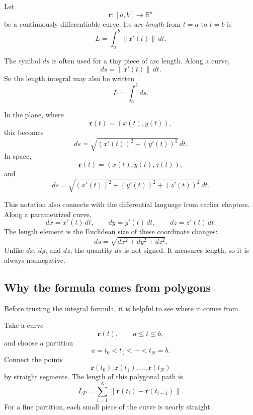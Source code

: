 \begin{definition}
Let
\[
    \mathbf r:[a,b]\to\mathbb R^n
\]
be a continuously differentiable curve.  Its \emph{arc length} from \(t=a\) to
\(t=b\) is
\[
\boxed{
    L=\int_a^b \|\mathbf r'(t)\|\,dt.
}
\]
\end{definition}

The symbol \(ds\) is often used for a tiny piece of arc length.  Along a curve,
\[
\boxed{
    ds=\|\mathbf r'(t)\|\,dt.
}
\]
So the length integral may also be written
\[
    L=\int_a^b ds.
\]

In the plane, where
\[
    \mathbf r(t)=(x(t),y(t)),
\]
this becomes
\[
\boxed{
    ds=\sqrt{(x'(t))^2+(y'(t))^2}\,dt.
}
\]
In space,
\[
    \mathbf r(t)=(x(t),y(t),z(t)),
\]
and
\[
\boxed{
    ds=\sqrt{(x'(t))^2+(y'(t))^2+(z'(t))^2}\,dt.
}
\]

This notation also connects with the differential language from earlier chapters.  Along
a parametrized curve,
\[
    dx=x'(t)\,dt,\qquad dy=y'(t)\,dt,\qquad dz=z'(t)\,dt.
\]
The length element is the Euclidean size of these coordinate changes:
\[
    ds=\sqrt{dx^2+dy^2+dz^2}.
\]
Unlike \(dx\), \(dy\), and \(dz\), the quantity \(ds\) is not signed.  It measures length,
so it is always nonnegative.

\subsection{Why the formula comes from polygons}

Before trusting the integral formula, it is helpful to see where it comes from.

Take a curve
\[
    \mathbf r(t),
    \qquad a\le t\le b,
\]
and choose a partition
\[
    a=t_0<t_1<\cdots<t_N=b.
\]
Connect the points
\[
    \mathbf r(t_0),\mathbf r(t_1),\ldots,\mathbf r(t_N)
\]
by straight segments.  The length of this polygonal path is
\[
    L_P
    =
    \sum_{i=1}^N
    \|\mathbf r(t_i)-\mathbf r(t_{i-1})\|.
\]
For a fine partition, each small piece of the curve is nearly straight.

